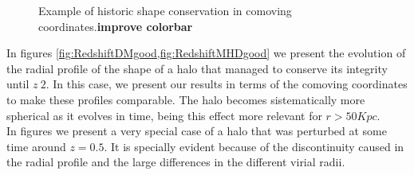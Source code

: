 \begin{figure}[!ht]
  \centering
  \hfill
  \caption{Example of historic shape conservation in comoving coordinates.\textbf{improve colorbar}}
\end{figure}

In figures \ref{fig:RedshiftDMgood,fig:RedshiftMHDgood} we present the evolution of the radial profile of the shape of a halo that managed to conserve its integrity until $z~2$. In this case, we present our results in terms of the comoving coordinates to make these profiles comparable. The halo becomes sistematically more spherical as it evolves in time, being this effect more relevant for $r>50Kpc$.\\

In figures \label{fig:RedshiftDMbad} we present a very special case of a halo that was perturbed at some time around $z=0.5$. It is specially evident because of the discontinuity caused in the radial profile and the large differences in the different virial radii. \\  


